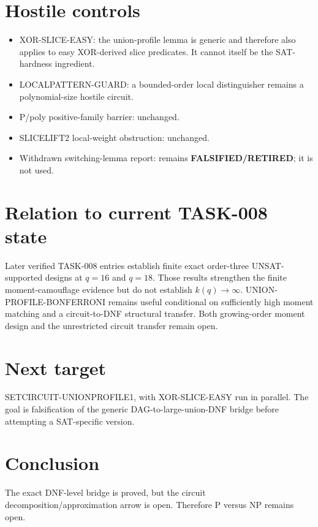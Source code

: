 \documentclass[11pt]{article}
\begin{document}
\section*{Hostile controls}
\begin{itemize}
\item XOR-SLICE-EASY: the union-profile lemma is generic and therefore also applies to easy XOR-derived slice predicates. It cannot itself be the SAT-hardness ingredient.
\item LOCALPATTERN-GUARD: a bounded-order local distinguisher remains a polynomial-size hostile circuit.
\item P/poly positive-family barrier: unchanged.
\item SLICELIFT2 local-weight obstruction: unchanged.
\item Withdrawn switching-lemma report: remains \textbf{FALSIFIED/RETIRED}; it is not used.
\end{itemize}

\section*{Relation to current TASK-008 state}
Later verified TASK-008 entries establish finite exact order-three UNSAT-supported designs at $q=16$ and $q=18$. Those results strengthen the finite moment-camouflage evidence but do not establish $k(q)\to\infty$. UNION-PROFILE-BONFERRONI remains useful conditional on sufficiently high moment matching and a circuit-to-DNF structural transfer. Both growing-order moment design and the unrestricted circuit transfer remain open.

\section*{Next target}
SETCIRCUIT-UNIONPROFILE1, with XOR-SLICE-EASY run in parallel. The goal is falsification of the generic DAG-to-large-union-DNF bridge before attempting a SAT-specific version.

\section*{Conclusion}
The exact DNF-level bridge is proved, but the circuit decomposition/approximation arrow is open. Therefore P versus NP remains open.

\end{document}
